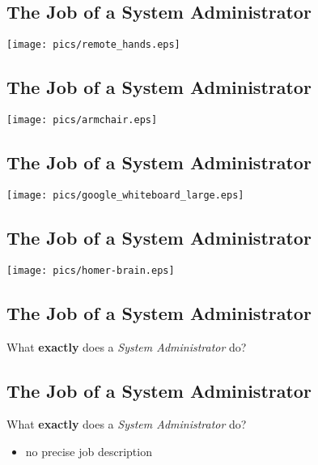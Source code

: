 \documentclass[xga]{xdvislides}
\begin{document}
\subsection{The Job of a System Administrator}
\vspace*{\fill}
\begin{center}
	\texttt{[image: pics/remote\_hands.eps]} \\
\end{center}
\vspace*{\fill}

\subsection{The Job of a System Administrator}
\vspace*{\fill}
\begin{center}
	\texttt{[image: pics/armchair.eps]} \\
\end{center}
\vspace*{\fill}

\subsection{The Job of a System Administrator}
\vspace*{\fill}
\begin{center}
	\texttt{[image: pics/google\_whiteboard\_large.eps]} \\
\end{center}
\vspace*{\fill}

\subsection{The Job of a System Administrator}
\vspace*{\fill}
\begin{center}
	\texttt{[image: pics/homer-brain.eps]} \\
\end{center}
\vspace*{\fill}

\subsection{The Job of a System Administrator}
What {\bf exactly} does a {\em System Administrator} do?

\subsection{The Job of a System Administrator}
What {\bf exactly} does a {\em System Administrator} do?
\begin{itemize}
	\item no precise job description
\end{itemize}
\end{document}
